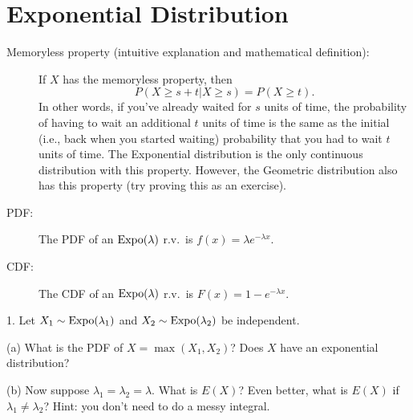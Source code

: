 \documentclass{article}
\begin{document}
 

\header

\section{Exponential Distribution}
\begin{description}

\item[Memoryless property (intuitive explanation and mathematical definition): ]

If $X$ has the memoryless property, then $$P(X \geq s + t| X \geq s) = P(X \geq t).$$ In other words, if you've already waited for $s$ units of time, the probability of having to wait an additional $t$ units of time is the same as the initial (i.e., back when you started waiting) probability that you had to wait $t$ units of time. The Exponential distribution is the only continuous distribution with this property. However, the Geometric distribution also has this property (try proving this as an exercise).

\item[PDF:] The PDF of an $\textrm{Expo}(\lambda)$ r.v.~is $f(x) = \lambda e^{-\lambda x}$.

\item[CDF:] The CDF of an $\textrm{Expo}(\lambda)$ r.v.~is $F(x) = 1 - e^{-\lambda x}$.

\end{description}

1. Let $X_1 \sim \textrm{Expo}(\lambda_1)$ and $X_2 \sim \textrm{Expo}(\lambda_2)$ be independent. 

(a) What is the PDF of $X = \max(X_1,X_2)$? Does $X$ have an exponential distribution? 


(b) Now suppose $\lambda_1 = \lambda_2 = \lambda$. What is $E(X)$? Even better, what is $E(X)$ if $\lambda_1 \neq \lambda_2$? Hint: you don't need to do a messy integral.
\end{document}
